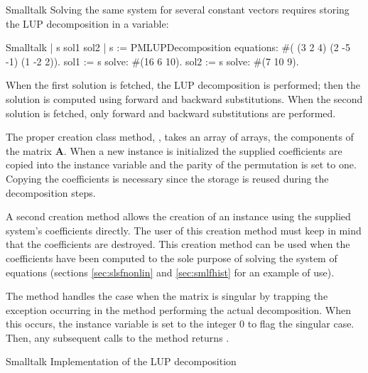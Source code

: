 \begin{displaycode}{Smalltalk}
Solving the same system for several constant vectors requires
storing the LUP decomposition in a variable:
\begin{displaycode}{Smalltalk}
 | s sol1 sol2 |
 s := PMLUPDecomposition equations: #( (3 2 4) (2 -5 -1) (1 -2 2)).
 sol1 := s solve: #(16 6 10).
 sol2 := s solve: #(7 10 9).
\end{displaycode}
When the first solution is fetched, the LUP decomposition is
performed; then the solution is computed using forward and
backward substitutions. When the second solution is fetched, only
forward and backward substitutions are performed.

The proper creation class method, , takes an array
of arrays, the components of the matrix $\textbf{A}$. When a new
instance is initialized the supplied coefficients are copied into
the instance variable  and the parity of the permutation
is set to one. Copying the coefficients is necessary since the
storage is reused during the decomposition steps. 

A second creation method  allows the creation of an
instance using the supplied system's coefficients directly. The
user of this creation method must keep in mind that the
coefficients are destroyed. This creation method can be used when
the coefficients have been computed to the sole purpose of solving
the system of equations (\cf sections \ref{sec:slsfnonlin} and
\ref{sec:smlfhist} for an example of use).

The method  handles the case when the
matrix is singular by trapping the exception occurring in the
method  performing the actual decomposition. When
this occurs, the instance variable  is set to the
integer 0 to flag the singular case. Then, any subsequent calls to
the method  returns .

\begin{listing}[label=lst:lup]{Smalltalk}
{Implementation of the LUP decomposition}
%
\end{listing}


\end{displaycode}
